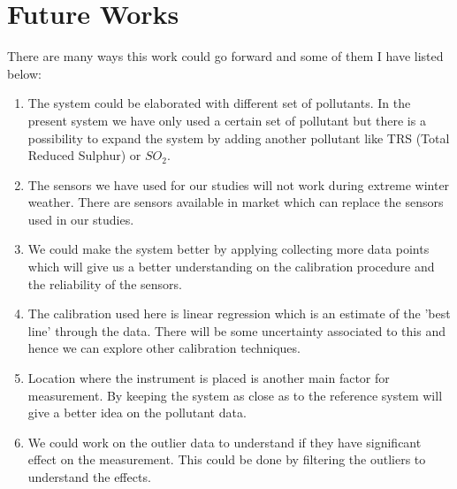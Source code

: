 \section{Future Works}

There are many ways this work could go forward and some of them I have listed below:
\begin{enumerate}
    \item The system could be elaborated with different set of pollutants. In the present system we have only used a certain set of pollutant but there is a possibility to expand the system by adding another pollutant like TRS (Total Reduced Sulphur) or $SO_{2}$.
    
    
    \item The sensors we have used for our studies will not work during extreme winter weather. There are sensors available in market which can replace the sensors used in our studies. 
     
    \item We could make the system better by applying collecting more data points which will give us a better understanding on the calibration procedure and the reliability of the sensors.
    
    \item The calibration used here is linear regression which is an estimate of the 'best line' through the data. There will be some uncertainty associated to this and hence we can explore other calibration techniques.
    
    \item Location where the instrument is placed is another main factor for measurement. By keeping the system as close as to the reference system will give a better idea on the pollutant data.
    
    \item We could work on the outlier data to understand if they have significant effect on the measurement. This could be done by filtering the outliers to understand the effects. 
    

\end{enumerate}

 


